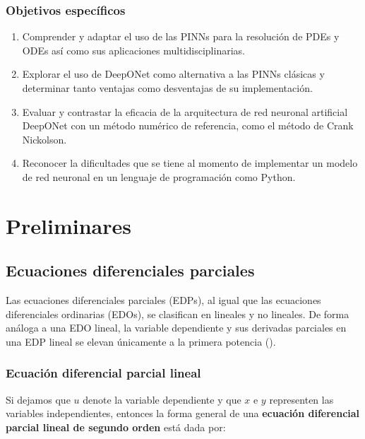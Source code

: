 \documentclass[
  spanish,
  us-letterpaper,
]{scrreprt}
\theoremstyle{plain}
\theoremstyle{definition}
\theoremstyle{remark}
\begin{document}
\section{Objetivos específicos}\label{objetivos-especuxedficos}

\begin{enumerate}
\def\labelenumi{\arabic{enumi}.}
\item
  Comprender y adaptar el uso de las PINNs para la resolución de PDEs y
  ODEs así como sus aplicaciones multidisciplinarias.
\item
  Explorar el uso de DeepONet como alternativa a las PINNs clásicas y
  determinar tanto ventajas como desventajas de su implementación.
\item
  Evaluar y contrastar la eficacia de la arquitectura de red neuronal
  artificial DeepONet con un método numérico de referencia, como el
  método de Crank Nickolson.
\item
  Reconocer la dificultades que se tiene al momento de implementar un
  modelo de red neuronal en un lenguaje de programación como Python.
\end{enumerate}

\part{Preliminares}

\chapter{Ecuaciones diferenciales
parciales}\label{ecuaciones-diferenciales-parciales}

Las ecuaciones diferenciales parciales (EDPs), al igual que las
ecuaciones diferenciales ordinarias (EDOs), se clasifican en lineales y
no lineales. De forma análoga a una EDO lineal, la variable dependiente
y sus derivadas parciales en una EDP lineal se elevan únicamente a la
primera potencia ().

\section{Ecuación diferencial parcial
lineal}\label{ecuaciuxf3n-diferencial-parcial-lineal}

Si dejamos que \(u\) denote la variable dependiente y que \(x\) e \(y\)
representen las variables independientes, entonces la forma general de
una \textbf{ecuación diferencial parcial lineal de segundo orden} está
dada por:
\end{document}
